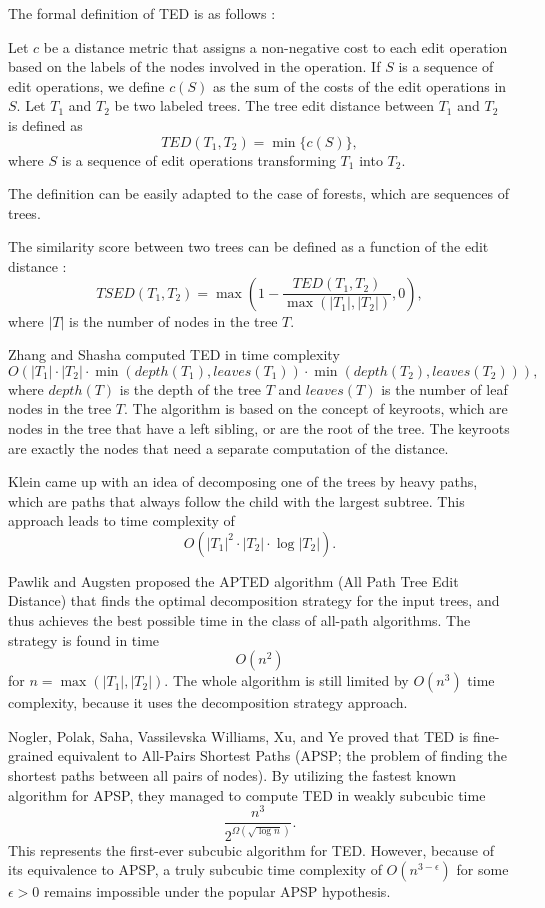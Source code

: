 The formal definition of TED is as follows \cite{zhang89}:
\begin{defn}
Let $c$ be a distance metric that assigns a non-negative cost to each edit operation based on the labels of the nodes involved in the operation.
If $S$ is a sequence of edit operations, we define $c(S)$ as the sum of the costs of the edit operations in $S$.
Let $T_1$ and $T_2$ be two labeled trees.
The tree edit distance between $T_1$ and $T_2$ is defined as
$$TED(T_1, T_2) = \min \{c(S)\},$$ where $S$ is a sequence of edit operations transforming $T_1$ into $T_2$.
\end{defn}
The definition can be easily adapted to the case of forests, which are sequences of trees.

The similarity score between two trees can be defined as a function of the edit distance \cite{song24}:
$$TSED(T_1, T_2) = \max\left(1-\dfrac{TED(T_1, T_2)}{\max(|T_1|, |T_2|)}, 0\right),$$ where $|T|$ is the number of nodes in the tree $T$.

Zhang and Shasha \cite{zhang89} computed TED in time complexity $$O(|T_1|\cdot |T_2|\cdot \min(depth(T_1), leaves(T_1))\cdot \min(depth(T_2), leaves(T_2))),$$ where $depth(T)$ is the depth of the tree $T$ and $leaves(T)$ is the number of leaf nodes in the tree $T$.
The algorithm is based on the concept of keyroots, which are nodes in the tree that have a left sibling, or are the root of the tree.
The keyroots are exactly the nodes that need a separate computation of the distance.

Klein \cite{klein98} came up with an idea of decomposing one of the trees by heavy paths, which are paths that always follow the child with the largest subtree.
This approach leads to time complexity of $$O(|T_1|^2\cdot |T_2|\cdot \log |T_2|).$$

Pawlik and Augsten \cite{apted15,apted16} proposed the APTED algorithm (All Path Tree Edit Distance) that finds the optimal decomposition strategy for the input trees, and thus achieves the best possible time in the class of all-path algorithms.
The strategy is found in time $$O(n^2)$$ for $n=\max(|T_1|,|T_2|)$.
The whole algorithm is still limited by $O(n^3)$ time complexity, because it uses the decomposition strategy approach.

Nogler, Polak, Saha, Vassilevska Williams, Xu, and Ye \cite{nogler25} proved that TED is fine-grained equivalent to All-Pairs Shortest Paths (APSP; the problem of finding the shortest paths between all pairs of nodes).
By utilizing the fastest known algorithm for APSP, they managed to compute TED in weakly subcubic time $$\dfrac{n^3}{2^{\Omega(\sqrt{\log n})}}.$$
This represents the first-ever subcubic algorithm for TED.
However, because of its equivalence to APSP, a truly subcubic time complexity of $O(n^{3-\epsilon})$ for some $\epsilon > 0$ remains impossible under the popular APSP hypothesis.

